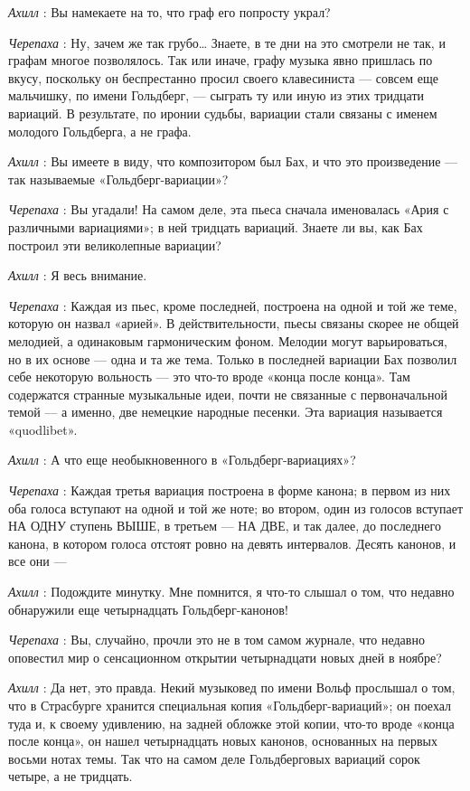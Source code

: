 \emph{Ахилл} : Вы намекаете на то, что граф его попросту украл?

\emph{Черепаха} : Ну, зачем же так грубо\ldots{} Знаете, в те дни на это смотрели не так, и графам многое позволялось. Так или иначе, графу музыка явно пришлась по вкусу, поскольку он беспрестанно просил своего клавесиниста --- совсем еще мальчишку, по имени Гольдберг, --- сыграть ту или иную из этих тридцати вариаций. В результате, по иронии судьбы, вариации стали связаны с именем молодого Гольдберга, а не графа.

\emph{Ахилл} : Вы имеете в виду, что композитором был Бах, и что это произведение --- так называемые «Гольдберг-вариации»?

\emph{Черепаха} : Вы угадали! На самом деле, эта пьеса сначала именовалась «Ария с различными вариациями»; в ней тридцать вариаций. Знаете ли вы, как Бах построил эти великолепные вариации?

\emph{Ахилл} : Я весь внимание.

\emph{Черепаха} : Каждая из пьес, кроме последней, построена на одной и той же теме, которую он назвал «арией». В действительности, пьесы связаны скорее не общей мелодией, а одинаковым гармоническим фоном. Мелодии могут варьироваться, но в их основе --- одна и та же тема. Только в последней вариации Бах позволил себе некоторую вольность --- это что-то вроде «конца после конца». Там содержатся странные музыкальные идеи, почти не связанные с первоначальной темой --- а именно, две немецкие народные песенки. Эта вариация называется «quodlibet».

\emph{Ахилл} : А что еще необыкновенного в «Гольдберг-вариациях»?

\emph{Черепаха} : Каждая третья вариация построена в форме канона; в первом из них оба голоса вступают на одной и той же ноте; во втором, один из голосов вступает НА ОДНУ ступень ВЫШЕ, в третьем --- НА ДВЕ, и так далее, до последнего канона, в котором голоса отстоят ровно на девять интервалов. Десять канонов, и все они ---

\emph{Ахилл} : Подождите минутку. Мне помнится, я что-то слышал о том, что недавно обнаружили еще четырнадцать Гольдберг-канонов!

\emph{Черепаха} : Вы, случайно, прочли это не в том самом журнале, что недавно оповестил мир о сенсационном открытии четырнадцати новых дней в ноябре?

\emph{Ахилл} : Да нет, это правда. Некий музыковед по имени Вольф прослышал о том, что в Страсбурге хранится специальная копия «Гольдберг-вариаций»; он поехал туда и, к своему удивлению, на задней обложке этой копии, что-то вроде «конца после конца», он нашел четырнадцать новых канонов, основанных на первых восьми нотах темы. Так что на самом деле Гольдберговых вариаций сорок четыре, а не тридцать.

